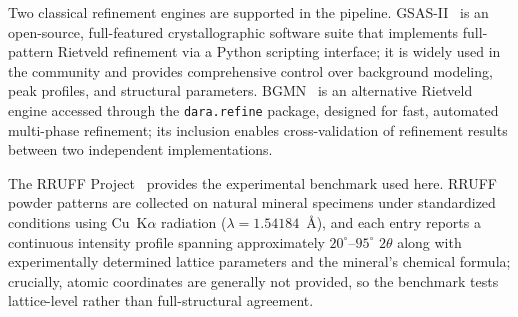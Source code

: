 \documentclass[pdflatex,sn-mathphys-num]{sn-jnl}
\theoremstyle{thmstyleone}
\theoremstyle{thmstyletwo}
\theoremstyle{thmstylethree}
\begin{document}
  Two classical refinement engines are supported in the pipeline. GSAS-II~\cite{toby2013}                                                                                         
  is an open-source, full-featured crystallographic software suite that implements
  full-pattern Rietveld refinement via a Python scripting interface; it is widely                                                                                                 
  used in the community and provides comprehensive control over background                                                                                                        
  modeling, peak profiles, and structural parameters. BGMN~\cite{bgmn1998} is an                                                                                                  
  alternative Rietveld engine accessed through the \texttt{dara.refine} package,                                                                                                  
  designed for fast, automated multi-phase refinement; its inclusion enables                                                                                                      
  cross-validation of refinement results between two independent implementations.                                                                                                 
                                                                                                                                                                                  
  The RRUFF Project~\cite{rruff2015} provides the experimental benchmark used here.                                                                                               
  RRUFF powder patterns are collected on natural mineral specimens under standardized                                                                                             
  conditions using Cu~K$\alpha$ radiation ($\lambda = 1.54184$~\AA), and each                                                                                                     
  entry reports a continuous intensity profile spanning approximately                                                                                                             
  $20^\circ$--$95^\circ$ $2\theta$ along with experimentally determined lattice                                                                                                   
  parameters and the mineral's chemical formula; crucially, atomic coordinates are                                                                                                
  generally not provided, so the benchmark tests lattice-level rather than                                                                                                        
  full-structural agreement.                                                                                                                                                      
                                                                                                                                                                                  
\end{document}
